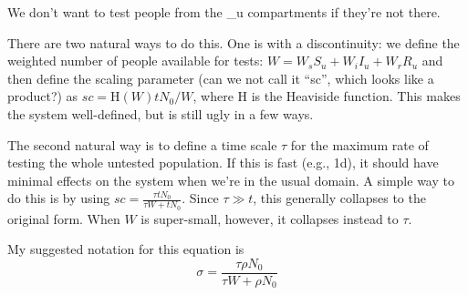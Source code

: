 We don't want to test people from the \_u compartments if they're not there.

There are two natural ways to do this. One is with a discontinuity: we define 
the weighted number of people available for tests: $W = W_s S_u + W_i I_u + W_r R_u$ and then define the scaling parameter (can we not call it ``sc'', which looks like a product?) as $sc = \textrm{H}(W) tN_0/W$, where H is the Heaviside function. This makes the system well-defined, but is still ugly in a few ways.

The second natural way is to define a time scale $\tau$ for the maximum rate of testing the whole untested population. If this is fast (e.g., 1d), it should have minimal effects on the system when we're in the usual domain. A simple way to do this is by using $sc = \frac{\tau tN_0}{\tau W + t N_0}$. Since $\tau \gg t$, this generally collapses to the original form. When $W$ is super-small, however, it collapses instead to $\tau$.

My suggested notation for this equation is $$\sigma = \frac{\tau \rho N_0}{\tau W + \rho N_0}$$
